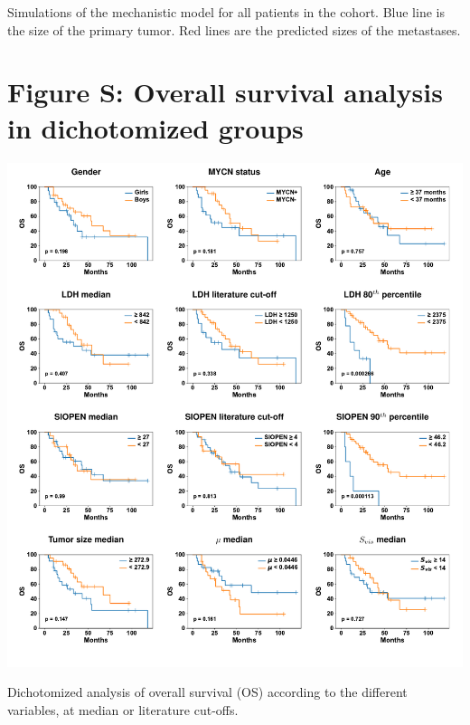 \documentclass[11pt]{article}
\newcounter{fignb}  %
\begin{document}
Simulations of the mechanistic model for all patients in the cohort. Blue line is the size of the primary tumor. Red lines are the predicted sizes of the metastases.
\newpage
{}
\section{Figure S: Overall survival analysis in dichotomized groups}
\spaceV
\begin{center}
\includegraphics[width=1\textwidth]{figure_S5}
\end{center}
Dichotomized analysis of overall survival (OS) according to the different variables, at median or literature cut-offs.
\newpage
{}
\end{document}
